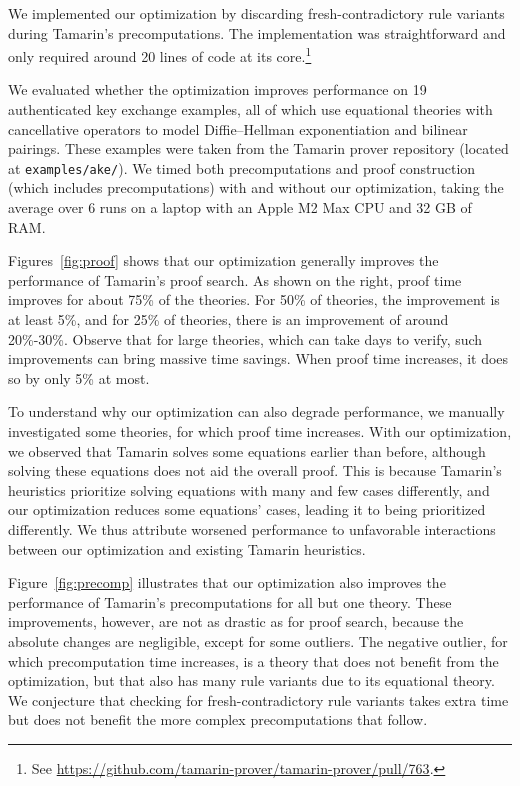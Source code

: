We implemented our optimization by discarding fresh-contradictory rule variants during Tamarin's precomputations.
The implementation was straightforward and only required around 20 lines of code at its core.\footnote{%
  See \url{https://github.com/tamarin-prover/tamarin-prover/pull/763}.
}

We evaluated whether the optimization improves performance on 19 authenticated key exchange examples, all of which use equational theories with cancellative operators to model Diffie--Hellman exponentiation and bilinear pairings.
These examples were taken from the Tamarin prover repository \cite{TamarinRepoVariantRestrictions} (located at \texttt{examples/ake/}).
We timed both precomputations and proof construction (which includes precomputations) with and without our optimization, taking the average over 6 runs on a laptop with an Apple M2 Max CPU and 32 GB of RAM.

Figures~\ref{fig:proof} shows that our optimization generally improves the performance of Tamarin's proof search.
As shown on the right, proof time improves for about 75\% of the theories.
For 50\% of theories, the improvement is at least 5\%, and for 25\% of theories, there is an improvement of around 20\%-30\%.
Observe that for large theories, which can take days to verify, such improvements can bring massive time savings.
When proof time increases, it does so by only 5\% at most.

To understand why our optimization can also degrade performance, we manually investigated some theories, for which proof time increases.
With our optimization, we observed that Tamarin solves some equations earlier than before, although solving these equations does not aid the overall proof.
This is because Tamarin's heuristics prioritize solving equations with many and few cases differently, and our optimization reduces some equations' cases, leading it to being prioritized differently.
We thus attribute worsened performance to unfavorable interactions between our optimization and existing Tamarin heuristics.

Figure~\ref{fig:precomp} illustrates that our optimization also improves the performance of Tamarin's precomputations for all but one theory.
These improvements, however, are not as drastic as for proof search, because the absolute changes are negligible, except for some outliers.
The negative outlier, for which precomputation time increases, is a theory that does not benefit from the optimization, but that also has many rule variants due to its equational theory.
We conjecture that checking for fresh-contradictory rule variants takes extra time but does not benefit the more complex precomputations that follow.

